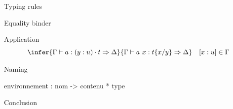 \documentclass[ignorenonframetext,red]{beamer}
\begin{document}
\begin{frame}{Typing rules}
  \begin{block}{Equality binder}
  \end{block}
  \pause
  \begin{block}{Application}
    \[ \infer
      {\Gamma\vdash a : (y:u)\cdot t \Rightarrow\Delta}
      {\Gamma\vdash a\ x : t \{x/y\} \Rightarrow\Delta}
      \quad [x : u] \in \Gamma
      \]
  \end{block}
\end{frame}

\begin{frame}{Naming}
  
\end{frame}

environnement : nom -> contenu * type

\begin{frame}{Conclusion}
  
\end{frame}
\end{document}
